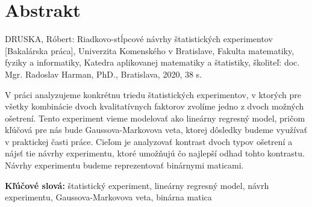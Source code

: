 \thispagestyle{empty}
\section*{Abstrakt}
DRUSKA, Róbert: Riadkovo-stĺpcové návrhy štatistických experimentov [Bakalárska práca],
Univerzita Komenského v Bratislave,
Fakulta matematiky, fyziky a informatiky,
Katedra aplikovanej matematiky a štatistiky,
školiteľ: doc. Mgr. Radoslav Harman, PhD.,
Bratislava, 2020, 38 s.

V práci analyzujeme konkrétnu triedu štatistických experimentov, v ktorých pre všetky kombinácie dvoch kvalitatívnych faktorov zvolíme jedno z dvoch možných ošetrení. 
Tento experiment vieme modelovať ako lineárny regresný model, pričom kľúčová pre nás bude Gaussova-Markovova veta, ktorej dôsledky budeme využívať v praktickej časti práce. 
Cieľom je analyzovať kontrast dvoch typov ošetrení a nájsť tie návrhy experimentu, ktoré umožňujú čo najlepší odhad tohto kontrastu.
Návrhy experimentu budeme reprezentovať binárnymi maticami.

\begin{flushleft}
  \textbf{Kľúčové slová:} štatistický experiment, lineárny regresný model, návrh experimentu, Gaussova-Markovova veta, binárna matica
\end{flushleft}